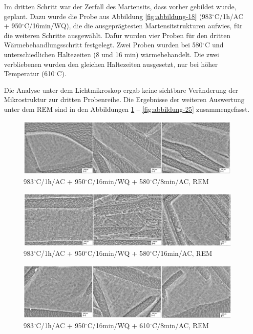 Im dritten Schritt war der Zerfall des Martensits, dass vorher gebildet wurde, geplant. Dazu wurde die Probe aus Abbildung \ref{fig:abbildung-18} (983$^\circ$C/1h/AC + 950$^\circ$C/16min/WQ), die die ausgeprägtesten Martensitstrukturen aufwies, für die weiteren Schritte ausgewählt. 
Dafür wurden vier Proben für den dritten Wärmebehandlungsschritt festgelegt. Zwei Proben wurden bei 580$^\circ$C und unterschiedlichen Haltezeiten (8 und 16 min) wärmebehandelt. Die zwei verbliebenen wurden den gleichen Haltezeiten ausgesetzt, nur bei höher Temperatur (610$^\circ$C).

Die Analyse unter dem Lichtmikroskop ergab keine sichtbare Veränderung der Mikrostruktur zur dritten Probenreihe. Die Ergebnisse der weiteren Auswertung unter dem REM sind in den Abbildungen \ref{fig:abbildung-22} -- \ref{fig:abbildung-25} zusammengefasst.

\begin{figure}[h]
	\centering
	\includegraphics[width=1.0\linewidth]{./Bilder/Abbildung 22.png}
	\caption[Abbildung 22]{983$^\circ$C/1h/AC + 950$^\circ$C/16min/WQ + 580$^\circ$C/8min/AC, REM}
	\label{fig:abbildung-22}
\end{figure}

\begin{figure}[h]
	\centering
	\includegraphics[width=1.0\linewidth]{./Bilder/Abbildung 23.png}
	\caption[Abbildung 23]{983$^\circ$C/1h/AC + 950$^\circ$C/16min/WQ + 580$^\circ$C/16min/AC, REM}
	\label{fig:abbildung-23}
\end{figure}

\begin{figure}[h]
	\centering
	\includegraphics[width=1.0\linewidth]{./Bilder/Abbildung 24.png}
	\caption[Abbildung 24]{983$^\circ$C/1h/AC + 950$^\circ$C/16min/WQ + 610$^\circ$C/8min/AC, REM}
	\label{fig:abbildung-24}
\end{figure}

